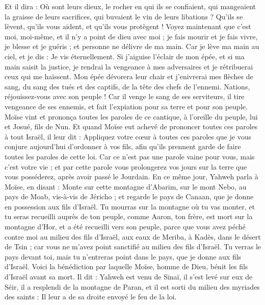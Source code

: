 \begin{multicols}{2}
Et il dira : Où sont leurs dieux, le rocher en qui ils se confiaient,
qui mangeaient la graisse de leurs sacrifices, qui buvaient le vin de leurs libations ? Qu'ils se lèvent, qu'ils vous aident, et qu'ils vous protègent !
Voyez maintenant que c'est moi, moi-même, et il n'y a point de dieu avec moi ; je fais mourir et je fais vivre, je blesse et je guéris ; et personne ne délivre de ma main.
Car je lève ma main au ciel, et je dis : Je vis éternellement.
Si j'aiguise l’éclair de mon épée, et si ma main saisit la justice, je rendrai la vengeance à mes adversaires et je rétribuerai ceux qui me haïssent.
Mon épée dévorera leur chair et j'enivrerai mes flèches de sang, du sang des tués et des captifs, de la tête des chefs de l’ennemi.
Nations, réjouissez-vous avec son peuple ! Car il venge le sang de ses serviteurs, il tire vengeance de ses ennemis, et fait l'expiation pour sa terre et pour son peuple.
Moïse vint et prononça toutes les paroles de ce cantique, à l’oreille du peuple, lui et Josué, fils de Nun.
Et quand Moïse eut achevé de prononcer toutes ces paroles à tout Israël,
il leur dit : Appliquez votre cœur à toutes ces paroles que je vous conjure aujourd'hui d’ordonner à vos fils, afin qu'ils prennent garde de faire toutes les paroles de cette loi.
Car ce n'est pas une parole vaine pour vous, mais c'est votre vie ; et par cette parole vous prolongerez vos jours sur la terre que vous posséderez, après avoir passé le Jourdain.
En ce même jour, Yahweh parla à Moïse, en disant :
Monte sur cette montagne d’Abarim, sur le mont Nebo, au pays de Moab, vis-à-vis de Jéricho ; et regarde le pays de Canaan, que je donne en possession aux fils d'Israël.
Tu mourras sur la montagne où tu vas monter, et tu seras recueilli auprès de ton peuple, comme Aaron, ton frère, est mort sur la montagne d'Hor, et a été recueilli vers son peuple,
parce que vous avez péché contre moi au milieu des fils d'Israël, aux eaux de Meriba, à Kadès, dans le désert de Tsin ; car vous ne m'avez point sanctifié au milieu des fils d'Israël.
Tu verras le pays devant toi, mais tu n’entreras point dans le pays, que je donne aux fils d'Israël.
\VerseOne{}Voici la bénédiction par laquelle Moïse, homme de Dieu, bénit les fils d'Israël avant sa mort.
Il dit : Yahweh est venu de Sinaï, il s'est levé sur eux de Séir, il a resplendi de la montagne de Paran, et il est sorti du milieu des myriades des saints : Il leur a de sa droite envoyé le feu de la loi.

\end{multicols}
